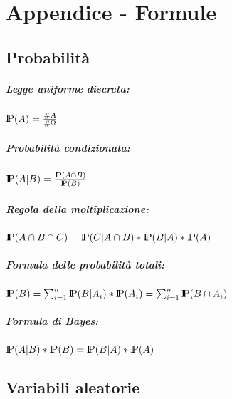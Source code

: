\chapter{Appendice - Formule}

\section{Probabilità}

\paragraph{Legge uniforme discreta:}

$\\\text{I\kern-0.2 em P}(A) = \frac{\#A}{\#\Omega}$

\paragraph{Probabilità condizionata:}

 $\\\text{I\kern-0.2 em P}(A | B) = \frac{\text{I\kern-0.2 em P}(A \cap B)}{\text{I\kern-0.2 em P}(B)}$

\paragraph{Regola della moltiplicazione:} 

$\\\text{I\kern-0.2 em P}(A \cap B \cap C) = \text{I\kern-0.2 em P} (C|A \cap B) * \text{I\kern-0.2 em P} (B|A) * \text{I\kern-0.2 em P} (A)$

\paragraph{Formula delle probabilità totali:}

$\\\text{I\kern-0.2 em P}(B) = \sum_{i = 1}^{n} \text{I\kern-0.2 em P} (B|A_i) * \text{I\kern-0.2 em P} (A_i) = \sum_{i = 1}^{n} \text{I\kern-0.2 em P} (B \cap A_i)$

\paragraph{Formula di Bayes:} 

$\\\text{I\kern-0.2 em P} (A|B) * \text{I\kern-0.2 em P} (B) = \text{I\kern-0.2 em P} (B|A) * \text{I\kern-0.2 em P} (A)$

\section{Variabili aleatorie}

